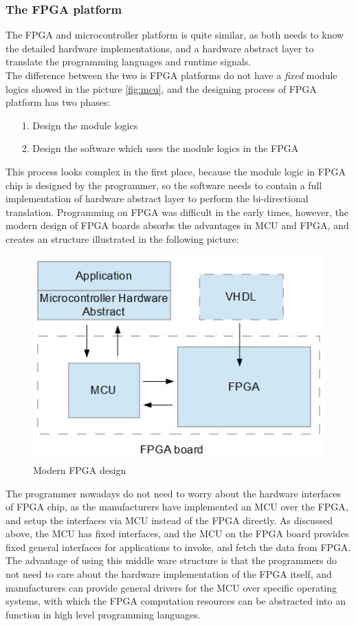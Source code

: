 \documentclass[11pt,openright,a4paper]{report}
\begin{document}
\subsubsection{The FPGA platform}
The FPGA and microcontroller platform is quite similar, as both needs to know the detailed hardware implementations, and a hardware abstract layer to translate the programming languages and runtime signals.\\
The difference between the two is FPGA platforms do not have a \textit{fixed} module logics showed in the picture \ref{fig:mcu}, and the designing process of FPGA platform has two phases:
\begin{itemize}
	\item[1.] Design the module logics
	\item[2.] Design the software which uses the module logics in the FPGA
\end{itemize}
This process looks complex in the first place, because the module logic in FPGA chip is designed by the programmer, so the software needs to contain a full implementation of hardware abstract layer to perform the bi-directional translation. Programming on FPGA was difficult in the early times, however, the modern design of FPGA boards absorbs the advantages in MCU and FPGA, and creates an structure illustrated in the following picture:
\begin{figure}[H]
\centering
\includegraphics[width=0.5\linewidth]{picture/fpgadesign}
\caption{Modern FPGA design}
\label{fig:fpgadesign}
\end{figure}
The programmer nowadays do not need to worry about the hardware interfaces of FPGA chip, as the manufacturers have implemented an MCU over the FPGA, and setup the interfaces via MCU instead of the FPGA directly. As discussed above, the MCU has fixed interfaces, and the MCU on the FPGA board provides fixed general interfaces for applications to invoke, and fetch the data from FPGA. The advantage of using this middle ware structure is that the programmers do not need to care about the hardware implementation of the FPGA itself, and manufacturers can provide general drivers for the MCU over specific operating systems, with which the FPGA computation resources can be abstracted into an function in high level programming languages.\\
\end{document}
